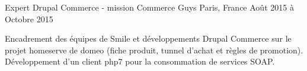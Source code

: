 \cventry
{Expert Drupal Commerce - mission} %
{Commerce Guys} %
{Paris, France} %
{Août 2015 à Octobre 2015} %
{
\begin{cvitems} %
    \item
    {
        Encadrement des équipes de Smile et développements Drupal Commerce sur le projet
        homeserve de domeo (fiche produit, tunnel d'achat et règles de promotion).
        Développement d'un client php7 pour la consommation de services SOAP.
    }
\end{cvitems}
}
